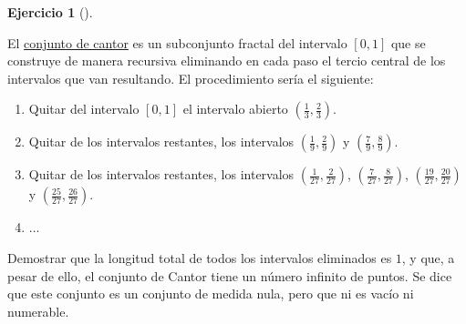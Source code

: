 \documentclass[
  a4paper,
]{scrreport}
\providecommand{\tightlist}{%
  \setlength{\itemsep}{0pt}\setlength{\parskip}{0pt}}\usepackage{longtable,booktabs,array}
\theoremstyle{definition}
\newtheorem{exercise}{Ejercicio}[chapter]
\theoremstyle{remark}
\begin{document}
\begin{exercise}[]\protect\hypertarget{exr-serie-conjunto-cantor}{}\label{exr-serie-conjunto-cantor}

El \href{https://es.wikipedia.org/wiki/Conjunto_de_Cantor}{conjunto de
cantor} es un subconjunto fractal del intervalo \([0,1]\) que se
construye de manera recursiva eliminando en cada paso el tercio central
de los intervalos que van resultando. El procedimiento sería el
siguiente:

\begin{enumerate}
\def\labelenumi{\arabic{enumi}.}
\tightlist
\item
  Quitar del intervalo \([0,1]\) el intervalo abierto
  \(\left(\frac{1}{3},\frac{2}{3}\right)\).
\item
  Quitar de los intervalos restantes, los intervalos
  \(\left(\frac{1}{9},\frac{2}{9}\right)\) y
  \(\left(\frac{7}{9},\frac{8}{9}\right)\).
\item
  Quitar de los intervalos restantes, los intervalos
  \(\left(\frac{1}{27},\frac{2}{27}\right)\),
  \(\left(\frac{7}{27},\frac{8}{27}\right)\),
  \(\left(\frac{19}{27},\frac{20}{27}\right)\) y
  \(\left(\frac{25}{27},\frac{26}{27}\right)\).
\item
  \(\ldots\)
\end{enumerate}

Demostrar que la longitud total de todos los intervalos eliminados es
\(1\), y que, a pesar de ello, el conjunto de Cantor tiene un número
infinito de puntos. Se dice que este conjunto es un conjunto de medida
nula, pero que ni es vacío ni numerable.

\end{exercise}
\end{document}
